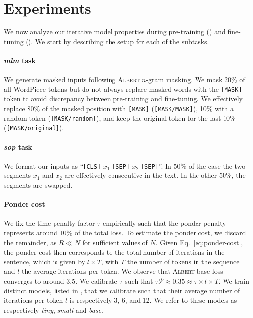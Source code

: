 \section{Experiments}

We now analyze our iterative model properties during pre-training () and fine-tuning (). We start by describing the setup for each of the subtasks.


\paragraph{\textit{mlm} task} We generate masked inputs following \textsc{Albert} $n$-gram masking. We mask 20\% of all WordPiece tokens but do not always replace masked words with the \texttt{[MASK]} token to avoid discrepancy between pre-training and fine-tuning. We effectively replace 80\% of the masked position with \texttt{[MASK]} (\texttt{[MASK/MASK]}), 10\% with a random token (\texttt{[MASK/random]}), and keep the original token for the last 10\% (\texttt{[MASK/original]}).

\paragraph{\textit{sop} task} We format our inputs as ``\texttt{[CLS]} $x_1$ \texttt{[SEP]} $x_2$ \texttt{[SEP]}''. In 50\% of the case the two segments $x_1$ and $x_2$ are effectively consecutive in the text. In the other 50\%, the segments are swapped. 

\paragraph{Ponder cost} We fix the time penalty factor $\tau$ empirically such that the ponder penalty represents around 10\% of the total loss. To estimate the ponder cost, we discard the remainder, as $R \ll N$ for sufficient values of $N$. Given Eq.~\ref{eq:ponder-cost}, the ponder cost then corresponds to the total number of iterations in the sentence, which is given by $l \times T$, with $T$ the number of tokens in the sequence and $l$ the average iterations per token. We observe that \textsc{Albert} base loss converges to around 3.5. We calibrate $\tau$ such that  $\tau\mathcal{P} \approx 0.35 \approx \tau \times l \times T$. We train distinct models, listed in , that we calibrate such that their average number of iterations per token $l$ is respectively 3, 6, and 12. We refer to these models as respectively \textit{tiny}, \textit{small} and \textit{base}. 

